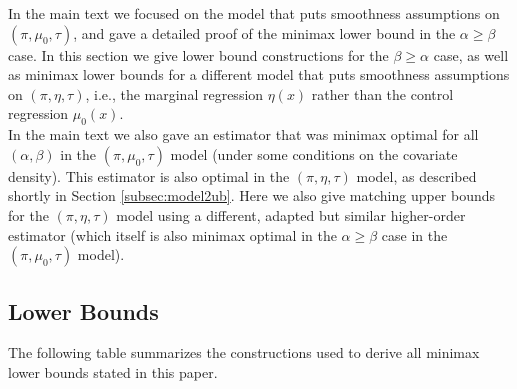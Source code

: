 \documentclass[11pt,twoside]{article}
\theoremstyle{definition}
\theoremstyle{remark}
\begin{document}
In the main text we focused on the model that puts smoothness assumptions on $(\pi,\mu_0,\tau)$, and gave a detailed proof of the minimax lower bound in the $\alpha \geq \beta$ case. In this section we give lower bound constructions for the $\beta \geq \alpha$ case, as well as minimax lower bounds for a different model that puts smoothness assumptions on $(\pi,\eta,\tau)$, i.e., the marginal regression $\eta(x)$ rather than the control regression $\mu_0(x)$. \\

In the main text we also gave an estimator that was minimax optimal for all $(\alpha,\beta)$ in the $(\pi,\mu_0,\tau)$ model (under some conditions on the covariate density). This estimator is also optimal in the $(\pi,\eta,\tau)$ model, as described shortly in Section \ref{subsec:model2ub}. Here we also give matching upper bounds for the $(\pi,\eta,\tau)$ model using a different, adapted but similar higher-order estimator (which itself is also  minimax optimal in the $\alpha  \geq \beta$ case in the $(\pi,\mu_0,\tau)$ model). \\

\subsection{Lower Bounds}
\label{subsec:model2lb}


The following table summarizes the constructions used to derive all minimax lower bounds stated in this paper. \\

\begin{table}[h!]
\centering
{}
\vspace{.1in}
\caption{The constructions used for our lower bound arguments. For the $\mu_0$ parametrization the density components are $(\pi,\mu_0,\tau)$ and for the $\eta$ parametrization the components are $(\pi,\eta,\tau)$. The first row is the construction detailed in the main text. The constructions in the first and third rows are equivalent, since $\eta=\pi\tau+\mu_0$, so that $\eta=\mu_{0\lambda}$ in the first row.  These first/third rows are the construction used in the first preprint of this paper.}
 \label{tab:constructions}
\end{table}
\end{document}

